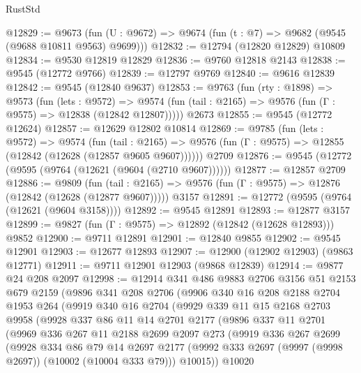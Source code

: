 \begin{lexlean}{RustStd}
\begin{coremodule}
@12829 := @9673
    (fun (U : @9672) => @9674 (fun (t : @7) => @9682 (@9545 (@9688 @10811 @9563) @9699)))
@12832 := @12794 (@12820 @12829) @10809
@12834 := @9530 @12819 @12829
@12836 := @9760 @12818 @2143
@12838 := @9545 (@12772 @9766)
@12839 := @12797 @9769
@12840 := @9616 @12839
@12842 := @9545 (@12840 @9637)
@12853 := @9763
    (fun (rty : @1898) =>
    @9573
      (fun (lets : @9572) =>
      @9574 (fun (tail : @2165) => @9576 (fun (Γ : @9575) => @12838 (@12842 @12807)))))
    @2673
@12855 := @9545 (@12772 @12624)
@12857 := @12629 @12802 @10814
@12869 := @9785
    (fun (lets : @9572) =>
    @9574
      (fun (tail : @2165) =>
      @9576 (fun (Γ : @9575) => @12855 (@12842 (@12628 (@12857 @9605 @9607))))))
    @2709
@12876 := @9545 (@12772 (@9595 (@9764 (@12621 (@9604 (@2710 @9607))))))
@12877 := @12857 @2709
@12886 := @9809
    (fun (tail : @2165) => @9576 (fun (Γ : @9575) => @12876 (@12842 (@12628 (@12877 @9607)))))
    @3157
@12891 := @12772 (@9595 (@9764 (@12621 (@9604 @3158))))
@12892 := @9545 @12891
@12893 := @12877 @3157
@12899 := @9827 (fun (Γ : @9575) => @12892 (@12842 (@12628 @12893))) @9852
@12900 := @9711 @12891
@12901 := @12840 @9855
@12902 := @9545 @12901
@12903 := @12677 @12893
@12907 := @12900 (@12902 @12903) (@9863 @12771)
@12911 := @9711 @12901 @12903 (@9868 @12839)
@12914 := @9877 @24 @208 @2097
@12998 := @12914
    @341
    @486
    @9883
    @2706
    @3156
    @51
    @2153
    @679
    @2159
    (@9896
      @341
      @208
      @2706
      (@9906
        @340
        @16
        @208
        @2188
        @2704
        @1953
        @264
        (@9919
          @340
          @16
          @2704
          (@9929
            @339
            @11
            @15
            @2168
            @2703
            @9958
            (@9928
              @337
              @86
              @11
              @14
              @2701
              @2177
              (@9896
                @337
                @11
                @2701
                (@9969
                  @336
                  @267
                  @11
                  @2188
                  @2699
                  @2097
                  @273
                  (@9919
                    @336
                    @267
                    @2699
                    (@9928
                      @334
                      @86
                      @79
                      @14
                      @2697
                      @2177
                      (@9992 @333 @2697 (@9997 (@9998 @2697)) (@10002 (@10004 @333 @79)))
                      @10015))
                  @10020

\end{coremodule}
\end{lexlean}
